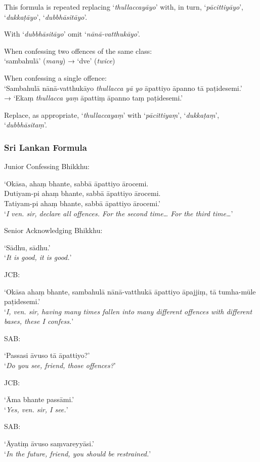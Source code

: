 This formula is repeated replacing ‘\emph{thullaccayāyo}’ with, in turn, ‘\emph{pācittiyāyo}’,
‘\emph{dukkaṭāyo}’, ‘\emph{dubbhāsitāyo}’.

With ‘\emph{dubbhāsitāyo}’ omit ‘\emph{nānā-vatthukāyo}’.

When confessing two offences of the same class:\\
‘sambahulā’ (\emph{many}) → ‘dve’ (\emph{twice})

When confessing a single offence:\\
‘Sambahulā nānā-vatthukāyo \emph{thullacca yā yo} āpattiyo āpanno tā paṭidesemi.’\\
→ ‘Ekaṃ \emph{thullacca yaṃ} āpattiṃ āpanno taṃ paṭidesemi.’

Replace, as appropriate, ‘\emph{thullaccayaṃ}’ with ‘\emph{pācittiyaṃ}’, ‘\emph{dukkaṭaṃ}’, ‘\emph{dubbhāsitaṃ}’.

\subsubsection{Sri Lankan Formula}

Junior Confessing Bhikkhu:

‘Okāsa, ahaṃ bhante, sabbā āpattiyo ārocemi.\\
Dutiyam-pi ahaṃ bhante, sabbā āpattiyo ārocemi.\\
Tatiyam-pi ahaṃ bhante, sabbā āpattiyo ārocemi.’\\
‘\emph{I ven. sir, declare all offences. For the second time… For the third time…}’

Senior Acknowledging Bhikkhu:

‘Sādhu, sādhu.’\\
‘\emph{It is good, it is good.}’

JCB:

‘Okāsa ahaṃ bhante, sambahulā nānā-vatthukā āpattiyo āpajjiṃ, tā tumha-mūle paṭidesemi.’\\
‘\emph{I, ven. sir, having many times fallen into many different offences with different bases, these I confess.}’

SAB:

‘Passasi āvuso tā āpattiyo?’\\
‘\emph{Do you see, friend, those offences?}’

JCB:

‘Āma bhante passāmi.’\\
‘\emph{Yes, ven. sir, I see.}’

SAB:

‘Āyatiṃ āvuso saṃvareyyāsi.’\\
‘\emph{In the future, friend, you should be restrained.}’

